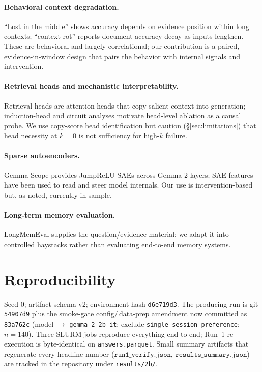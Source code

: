 \documentclass[10pt,twocolumn]{article}
\newcommand{\kof}[1]{k\!=\!#1}
\begin{document}
\paragraph{Behavioral context degradation.} ``Lost in the middle''
\citep{liu2023lost} shows accuracy depends on evidence position within long
contexts; ``context rot'' reports \citep{chroma2024contextrot} document accuracy
decay as inputs lengthen. These are behavioral and largely correlational; our
contribution is a paired, evidence-in-window design that pairs the behavior with
internal signals and intervention.

\paragraph{Retrieval heads and mechanistic interpretability.} Retrieval heads
\citep{wu2024retrievalheads} are attention heads that copy salient context into
generation; induction-head and circuit analyses motivate head-level ablation as a
causal probe. We use copy-score head identification but caution (\S\ref{sec:limitations})
that head necessity at $\kof{0}$ is not sufficiency for high-$k$ failure.

\paragraph{Sparse autoencoders.} Gemma Scope \citep{lieberum2024gemmascope}
provides JumpReLU SAEs across Gemma-2 layers; SAE features have been used to read
and steer model internals. Our use is intervention-based but, as noted, currently
in-sample.

\paragraph{Long-term memory evaluation.} LongMemEval \citep{wu2024longmemeval}
supplies the question/evidence material; we adapt it into controlled haystacks
rather than evaluating end-to-end memory systems.

\section{Reproducibility}
Seed $0$; artifact schema v2; environment hash \texttt{d6e719d3}. The producing
run is git \texttt{54907d9} plus the smoke-gate config/\,data-prep amendment now
committed as \texttt{83a762c} (model $\rightarrow$ \texttt{gemma-2-2b-it};
exclude \texttt{single-session-preference}; $n{=}140$). Three SLURM jobs
reproduce everything end-to-end; Run~1 re-execution is byte-identical on
\texttt{answers.parquet}. Small summary artifacts that regenerate every headline
number ($\texttt{run1\_verify.json}$, $\texttt{results\_summary.json}$) are
tracked in the repository under \texttt{results/2b/}.
\end{document}
